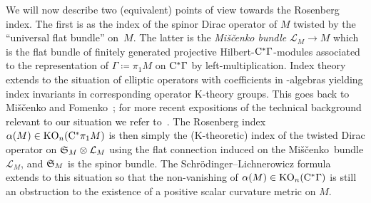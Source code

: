 \documentclass[pdftex]{sigma}
\numberwithin{equation}{section}
\newcommand*{\Mishchenko}{Mi\v{s}\v{c}enko}
\begin{document}
We will now describe two (equivalent) points of view towards the Rosenberg index.
The first is as the index of the spinor Dirac operator of \(M\) twisted by the ``universal flat bundle'' on~\(M\).
The latter is the \emph{Mi\v{s}\v{c}enko bundle} \(\mathcal{L}_M \to M\) which is the flat bundle of finitely generated projective Hilbert-\(\mathrm{C}^\ast \Gamma\)-modules associated to the representation of \(\Gamma \coloneqq \pi_1 M\) on \(\mathrm{C}^\ast \Gamma\) by left-multiplication.
Index theory extends to the situation of elliptic operators with coefficients in \textCstar-algebras yielding index invariants in corresponding operator K-theory groups.
This goes back to Mi\v{s}\v{c}enko and Fomenko~\cite{Mishchenko-Fomenko:Index}; for more recent expositions of the technical background relevant to our situation we refer to~\cite{Ebert:EllipticRegularityDirac,HankePapeSchick:CodimensionTwoIndex}.
The Rosenberg index \(\alpha(M) \in \operatorname{KO}_n(\mathrm{C}^\ast \pi_1 M)\) is then simply the (K-theoretic) index of the twisted Dirac operator on \(\mathfrak{S}_M \otimes \mathcal{L}_M\) using the flat connection induced on the \Mishchenko\ bundle \(\mathcal{L}_M\), and \(\mathfrak{S}_M\) is the spinor bundle.
The Schr\"odinger--Lichnerowicz formula extends to this situation so that the non-vanishing of \(\alpha(M) \in \operatorname{KO}_n(\mathrm{C}^\ast \Gamma)\) is still an obstruction to the existence of a positive scalar curvature metric on \(M\).
\end{document}

